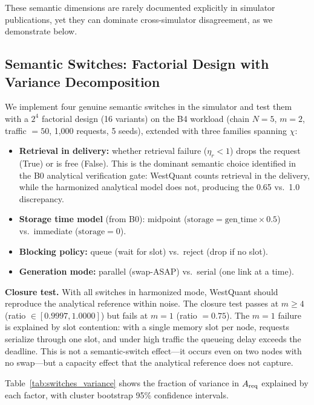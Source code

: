 \documentclass[aps,prapplied,reprint,superscriptaddress]{revtex4-2}
\begin{document}
These semantic dimensions are rarely documented explicitly in simulator publications, yet they can dominate cross-simulator disagreement, as we demonstrate below.

\subsection{Semantic Switches: Factorial Design with Variance Decomposition}
\label{sec:switches_1000}

We implement four genuine semantic switches in the simulator and test them with a $2^4$ factorial design (16 variants) on the B4 workload (chain $N=5$, $m=2$, traffic $=50$, 1{,}000 requests, 5 seeds), extended with three families spanning $\chi$:

\begin{itemize}[leftmargin=2em]
\item \textbf{Retrieval in delivery:} whether retrieval failure ($\eta_r < 1$) drops the request (True) or is free (False). This is the dominant semantic choice identified in the B0 analytical verification gate: WestQuant counts retrieval in the delivery, while the harmonized analytical model does not, producing the 0.65 vs.\ 1.0 discrepancy.
\item \textbf{Storage time model} (from B0): midpoint ($\mathrm{storage} = \mathrm{gen\_time} \times 0.5$) vs.\ immediate ($\mathrm{storage} = 0$).
\item \textbf{Blocking policy:} queue (wait for slot) vs.\ reject (drop if no slot).
\item \textbf{Generation mode:} parallel (swap-ASAP) vs.\ serial (one link at a time).
\end{itemize}

\textbf{Closure test.} With all switches in harmonized mode, WestQuant should reproduce the analytical reference within noise. The closure test passes at $m \ge 4$ (ratio $\in [0.9997, 1.0000]$) but fails at $m = 1$ (ratio $= 0.75$). The $m = 1$ failure is explained by slot contention: with a single memory slot per node, requests serialize through one slot, and under high traffic the queueing delay exceeds the deadline. This is not a semantic-switch effect---it occurs even on two nodes with no swap---but a capacity effect that the analytical reference does not capture.

Table~\ref{tab:switches_variance} shows the fraction of variance in $A_{\rm req}$ explained by each factor, with cluster bootstrap 95\% confidence intervals.
\end{document}

